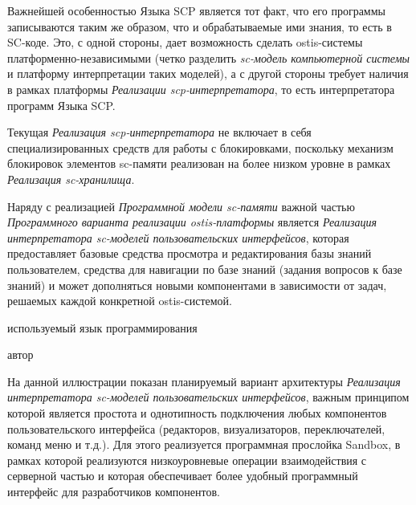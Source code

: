 Важнейшей особенностью Языка SCP является тот факт, что его программы записываются таким же образом, что и обрабатываемые
ими знания, то есть в SC-коде. Это, с одной стороны, дает возможность сделать ostis-системы платформенно-независимыми
(четко разделить \textit{sc-модель компьютерной системы} и платформу интерпретации таких моделей), а с другой стороны
требует наличия в рамках платформы \textit{Реализации scp-интерпретатора}, то есть интерпретатора программ Языка SCP.

Текущая \textit{Реализация scp-интерпретатора} не включает в себя специализированных средств для работы с блокировками,
поскольку механизм блокировок элементов sc-памяти реализован на более низком уровне в рамках \textit{Реализация
sc-хранилища}.

Наряду с реализацией \textit{Программной модели sc-памяти} важной частью \textit{Программного варианта реализации
ostis-платформы} является \textit{Реализация интерпретатора sc-моделей пользовательских интерфейсов}, которая
предоставляет базовые средства просмотра и редактирования базы знаний пользователем, средства для навигации по базе знаний
(задания вопросов к базе знаний) и может дополняться новыми компонентами в зависимости от задач, решаемых каждой
конкретной ostis-системой.

\begin{SCn}
\begin{scnrelfromlist}{используемый язык программирования}
\end{scnrelfromlist}
\begin{scnrelfromlist}{автор}
\end{scnrelfromlist}
\end{SCn}

На данной иллюстрации показан планируемый вариант архитектуры \textit{Реализация интерпретатора sc-моделей пользовательских
интерфейсов}, важным принципом которой является простота и однотипность подключения любых компонентов пользовательского
интерфейса (редакторов, визуализаторов, переключателей, команд меню и т.д.). Для этого реализуется программная прослойка
Sandbox, в рамках которой реализуются низкоуровневые операции взаимодействия с серверной частью и которая обеспечивает
более удобный программный интерфейс для разработчиков компонентов.

